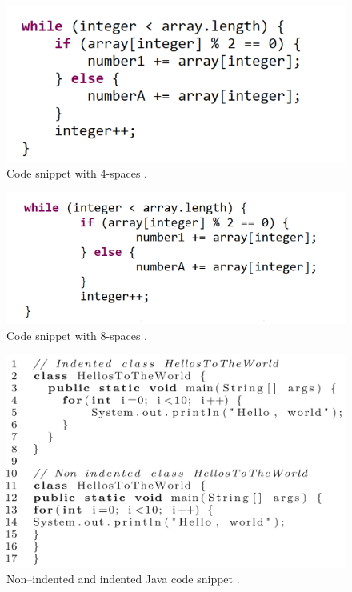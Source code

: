 \begin{figure} [H]
  \centering
  \includegraphics [scale=0.9]
  {figures/4.png}
  \caption{Code snippet with 4-spaces \cite{bauer2017indentations}.}
  \label{fig:AnhangsChor}
\end{figure}

\begin{figure} [H]
  \centering
  \includegraphics [scale=1]
  {figures/8.png}
  \caption{Code snippet with 8-spaces \cite{bauer2017indentations}.}
  \label{fig:AnhangsChor}
\end{figure}


\begin{figure} [H]
  \centering
  \includegraphics [scale=0.8]
  {figures/indentation_ex.png}
  \caption{Non–indented and indented Java code snippet \cite{hanenberg2024indentation}.}
  \label{fig:AnhangsChor}
\end{figure}

